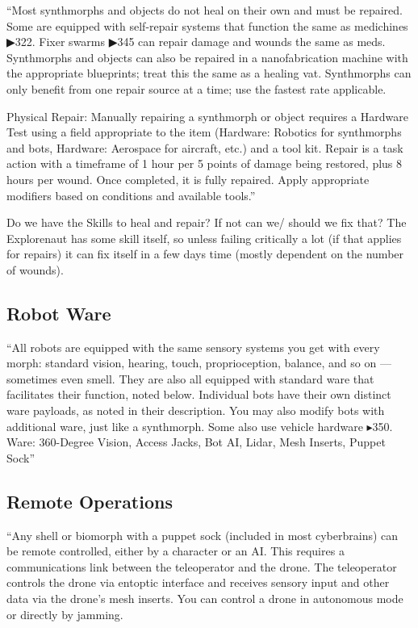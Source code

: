 “Most synthmorphs and objects do not heal on their own and must be repaired. Some are equipped with self-repair systems that function the same as medichines ▶322. Fixer swarms ▶345 can repair damage and wounds the same as meds. Synthmorphs and objects can also be repaired in a nanofabrication machine with the appropriate blueprints; treat this the same as a healing vat. Synthmorphs can only benefit from one repair source at a time; use the fastest rate applicable.

Physical Repair: Manually repairing a synthmorph or object requires a Hardware Test using a field appropriate to the item (Hardware: Robotics for synthmorphs and bots, Hardware: Aerospace for aircraft, etc.) and a tool kit. Repair is a task action with a timeframe of 1 hour per 5 points of damage being restored, plus 8 hours per wound. Once completed, it is fully repaired. Apply appropriate modifiers based on conditions and available tools.” \citep[pg. 221]{ep2e_1.1_2019}

Do we have the Skills to heal and repair? If not can we/ should we fix that? The Explorenaut has some skill itself, so unless failing critically a lot (if that applies for repairs) it can fix itself in a few days time (mostly dependent on the number of wounds).


\subsection{Robot Ware}

“All robots are equipped with the same sensory systems you get with every morph: standard vision, hearing, touch, proprioception, balance, and so on — sometimes even smell. They are also all equipped with standard ware that facilitates their function, noted below. Individual bots have their own distinct ware payloads, as noted in their description. You may also modify bots with additional ware, just like a synthmorph. Some also use vehicle hardware $\blacktriangleright$350. Ware: 360-Degree Vision, Access Jacks, Bot AI, Lidar, Mesh Inserts, Puppet Sock” \citep[pg. 346]{ep2e_1.1_2019}

\subsection{Remote Operations}

“Any shell or biomorph with a puppet sock (included in most cyberbrains) can be remote controlled, either by a character or an AI. This requires a communications link between the teleoperator and the drone. The teleoperator controls the drone via entoptic interface and receives sensory input and other data via the drone’s mesh inserts. You can control a drone in autonomous mode or directly by jamming.

